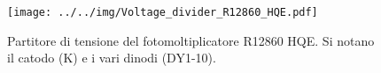 \begin{figure}[h]\centering\texttt{[image: ../../img/Voltage\_divider\_R12860\_HQE.pdf]}\caption{Partitore di tensione del fotomoltiplicatore R12860 HQE. Si notano il catodo (K) e i vari dinodi (DY1-10).}\label{fig:Voltage_divider_R12860_HQE}\end{figure}

